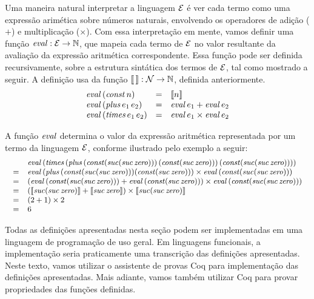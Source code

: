 \begin{Definition}\label{def:sem:Exp}
Uma maneira natural interpretar a linguagem $\mathcal{E}$ é ver cada termo como uma  expressão arimética sobre números naturais, envolvendo os operadores de adição ($+$) e multiplicação ($\times$). Com essa interpretação em mente, vamos definir uma função $\textit{eval\/} : \mathcal{E} \rightarrow \mathbb{N}$, que mapeia cada termo de $\mathcal{E}$ no valor resultante da avaliação da expressão aritmética correspondente. Essa função pode ser definida recursivamente, sobre a estrutura sintática dos termos de $\mathcal{E}$, tal como mostrado a seguir. A definição usa da função  $\llbracket\,\rrbracket : \mathcal{N} \rightarrow \mathbb{N}$, definida anteriormente.
\[
\begin{array}{lcl}
\textit{eval\/}\, (\textit{const\/}\, n)  & = & \llbracket n \rrbracket \\
\textit{eval\/}\, (\textit{plus\/}\,e_1\,e_2) & = & \textit{eval\/}\,e_1 + \textit{eval\/}\,e_2 \\
\textit{eval\/}\, (\textit{times\/}\,e_1\,e_2) & = & \textit{eval\/}\,e_1 \times \textit{eval\/}\,e_2 \\
\end{array}
\]
\end{Definition}
A função $\textit{eval\/}$ determina o valor da expressão aritmética representada por um termo da linguagem $\mathcal{E}$, conforme ilustrado pelo exemplo a seguir:
\[ \small{
\begin{array}{ll}
&\textit{eval\/}\, (\textit{times\/}\,(\textit{plus\/}\,(\textit{const\/}(\textit{suc\/}(\textit{suc\/}\,\textit{zero\/})))\, (\textit{const\/}(\textit{suc\/}\,\textit{zero\/})))\, (\textit{const\/}(\textit{suc\/}(\textit{suc\/}\,\textit{zero\/})))) \\
= & \textit{eval\/}\, (\textit{plus\/}\,(\textit{const\/}(\textit{suc\/}(\textit{suc\/}\,\textit{zero\/}))) (\textit{const\/}(\textit{suc\/}\,\textit{zero\/}))) \times \textit{eval\/}\, (\textit{const\/}(\textit{suc\/}(\textit{suc\/}\, \textit{zero\/})))  \\
=  & (\textit{eval\/}\, (\textit{const\/}(\textit{suc\/}(\textit{suc\/}\,\textit{zero\/}))) + \textit{eval\/}\,  (\textit{const\/}(\textit{suc\/}\,\textit{zero\/}))) \times \textit{eval\/}\, (\textit{const\/}(\textit{suc\/}(\textit{suc\/}\, \textit{zero\/}))) \\
=  & (\llbracket \textit{suc\/}(\textit{suc\/}\,\textit{zero\/}) \rrbracket + \llbracket  \textit{suc\/}\,\textit{zero\/}\rrbracket) \times \llbracket \textit{suc\/}(\textit{suc\/}\,\textit{zero\/}) \rrbracket \\
=  & (2 + 1) \times 2 \\
= & 6 
\end{array}}
\]

Todas as defini\c{c}\~oes apresentadas nesta se\c{c}\~ao podem ser implementadas em uma linguagem de programação de uso geral. Em linguagens funcionais, a implementação seria praticamente uma transcrição das definições apresentadas. Neste texto, vamos utilizar o assistente de provas Coq para implementação das definições apresentadas. Mais adiante, vamos também utilizar Coq para provar propriedades das funções definidas. 

